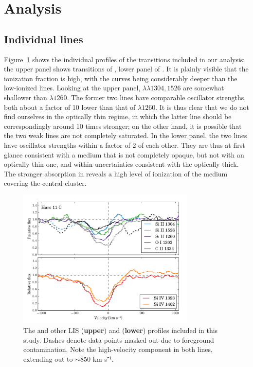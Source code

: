 \documentclass[twocolumn]{aastex61}
\begin{document}
\section{Analysis}\label{analysis}

\subsection{Individual lines}\label{individual-lines}

Figure~\ref{fig:SingleLines} shows the individual profiles of the
transitions included in our analysis; the upper panel shows transitions
of , lower panel of . It is plainly visible that
the ionization fraction is high, with the  curves being
considerably deeper than the low-ionized lines. Looking at the upper
panel,  $\lambda \lambda 1304, 1526$ are somewhat shallower
than  $\lambda 1260$. The former two lines have comparable
oscillator strengths, both about a factor of 10 lower than that of
$\lambda 1260$. It is thus clear that we do not find ourselves in the
optically thin regime, in which the latter line should be
correspondingly around 10 times stronger; on the other hand, it is
possible that the two weak lines are not completely saturated. In the
lower panel, the two  lines have oscillator strengths within
a factor of 2 of each other. They are thus at first glance consistent
with a medium that is not completely opaque, but not with an optically
thin one, and within uncertainties consistent with the optically thick.
The stronger absorption in  reveals a high level of
ionization of the medium covering the central cluster.

\begin{figure}
\centering
\includegraphics[width=3.500in]{../Figs/HISLISProfiles.pdf}
\caption{The  and other LIS (\textbf{upper}) and 
(\textbf{lower}) profiles included in this study. Dashes denote data
points masked out due to foreground contamination. Note the
high-velocity component in both  lines, extending out to
$\sim 850$ km s⁻¹.}\label{fig:SingleLines}
\end{figure}
\end{document}
